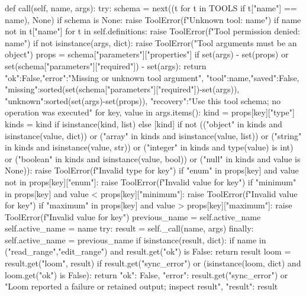     def call(self, name, args):
        try:
            schema = next((t for t in TOOLS if t["name"] == name), None)
            if schema is None:
                raise ToolError(f"Unknown tool: {name}")
            if name not in {t["name"] for t in self.definitions}:
                raise ToolError(f"Tool permission denied: {name}")
            if not isinstance(args, dict):
                raise ToolError("Tool arguments must be an object")
            props = schema["parameters"]["properties"]
            if set(args) - set(props) or set(schema["parameters"]["required"]) - set(args):
                return {"ok":False,"error":"Missing or unknown tool argument",
                        "tool":name,"saved":False,
                        "missing":sorted(set(schema["parameters"]["required"])-set(args)),
                        "unknown":sorted(set(args)-set(props)),
                        "recovery":"Use this tool schema; no operation was executed"}
            for key, value in args.items():
                kind = props[key]["type"]
                kinds = kind if isinstance(kind, list) else [kind]
                if not (("object" in kinds and isinstance(value, dict)) or ("array" in kinds and isinstance(value, list)) or ("string" in kinds and isinstance(value, str)) or
                    ("integer" in kinds and type(value) is int) or
                    ("boolean" in kinds and isinstance(value, bool)) or ("null" in kinds and value is None)):
                    raise ToolError(f"Invalid type for {key}")
                if "enum" in props[key] and value not in props[key]["enum"]:
                    raise ToolError(f"Invalid value for {key}")
                if "minimum" in props[key] and value < props[key]["minimum"]:
                    raise ToolError(f"Invalid value for {key}")
                if "maximum" in props[key] and value > props[key]["maximum"]:
                    raise ToolError(f"Invalid value for {key}")
            previous_name = self.active_name
            self.active_name = name
            try:
                result = self._call(name, args)
            finally:
                self.active_name = previous_name
            if isinstance(result, dict):
                if name in ("read_range","edit_range") and result.get("ok") is False:
                    return result
                loom = result.get("loom", result)
                if result.get("sync_error") or (isinstance(loom, dict) and loom.get("ok") is False):
                    return {"ok": False, "error": result.get("sync_error") or "Loom reported a failure or retained output; inspect result", "result": result}
